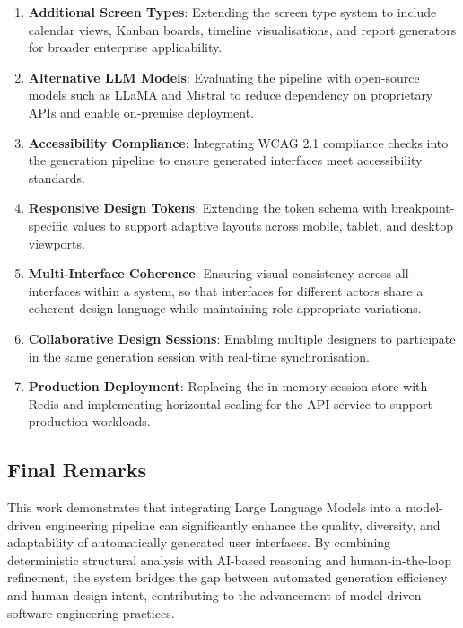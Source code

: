 \begin{enumerate}
    \item \textbf{Additional Screen Types}: Extending the screen type system to include calendar views, Kanban boards, timeline visualisations, and report generators for broader enterprise applicability.
    
    \item \textbf{Alternative LLM Models}: Evaluating the pipeline with open-source models such as LLaMA and Mistral to reduce dependency on proprietary APIs and enable on-premise deployment.
    
    \item \textbf{Accessibility Compliance}: Integrating WCAG 2.1 compliance checks into the generation pipeline to ensure generated interfaces meet accessibility standards.
    
    \item \textbf{Responsive Design Tokens}: Extending the token schema with breakpoint-specific values to support adaptive layouts across mobile, tablet, and desktop viewports.
    
    \item \textbf{Multi-Interface Coherence}: Ensuring visual consistency across all interfaces within a system, so that interfaces for different actors share a coherent design language while maintaining role-appropriate variations.
    
    \item \textbf{Collaborative Design Sessions}: Enabling multiple designers to participate in the same generation session with real-time synchronisation.
    
    \item \textbf{Production Deployment}: Replacing the in-memory session store with Redis and implementing horizontal scaling for the API service to support production workloads.
\end{enumerate}


\subsection{Final Remarks}

This work demonstrates that integrating Large Language Models into a model-driven engineering pipeline can significantly enhance the quality, diversity, and adaptability of automatically generated user interfaces. By combining deterministic structural analysis with AI-based reasoning and human-in-the-loop refinement, the system bridges the gap between automated generation efficiency and human design intent, contributing to the advancement of model-driven software engineering practices.
